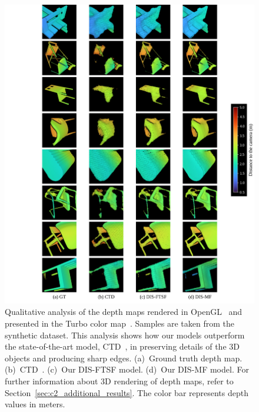 \begin{figure}[t]
    \begin{center}
        \includegraphics[width=1.0\linewidth]{images/chapter2/supp_figures/rendered.jpg}
    \end{center}
   \caption{Qualitative analysis of the depth maps rendered in OpenGL~\citep{shreiner2013opengl} and presented in the Turbo color map~\citep{mikhailov2019turbo}. Samples are taken from the synthetic dataset. This analysis shows how our models outperform the state-of-the-art model, CTD~\citep{riegler2019connecting}, in preserving details of the 3D objects and producing sharp edges. (a)~Ground truth depth map. (b)~CTD~\citep{riegler2019connecting}. (c)~Our DIS-FTSF model. (d)~Our DIS-MF model. For further information about 3D rendering of depth maps, refer to Section~\ref{sec:c2_additional_results}. The color bar represents depth values in meters.}
    \label{fig:c2_rendered}
\end{figure}

